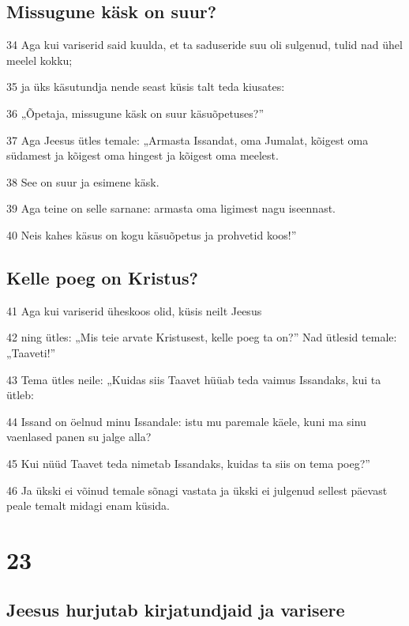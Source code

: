 \section*{Missugune käsk on suur?}

\par 34 Aga kui variserid said kuulda, et ta saduseride suu oli sulgenud, tulid nad ühel meelel kokku;
\par 35 ja üks käsutundja nende seast küsis talt teda kiusates:
\par 36 „Õpetaja, missugune käsk on suur käsuõpetuses?”
\par 37 Aga Jeesus ütles temale: „Armasta Issandat, oma Jumalat, kõigest oma südamest ja kõigest oma hingest ja kõigest oma meelest.
\par 38 See on suur ja esimene käsk.
\par 39 Aga teine on selle sarnane: armasta oma ligimest nagu iseennast.
\par 40 Neis kahes käsus on kogu käsuõpetus ja prohvetid koos!”

\section*{Kelle poeg on Kristus?}

\par 41 Aga kui variserid üheskoos olid, küsis neilt Jeesus
\par 42 ning ütles: „Mis teie arvate Kristusest, kelle poeg ta on?” Nad ütlesid temale: „Taaveti!”
\par 43 Tema ütles neile: „Kuidas siis Taavet hüüab teda vaimus Issandaks, kui ta ütleb:
\par 44 Issand on öelnud minu Issandale: istu mu paremale käele, kuni ma sinu vaenlased panen su jalge alla?
\par 45 Kui nüüd Taavet teda nimetab Issandaks, kuidas ta siis on tema poeg?”
\par 46 Ja ükski ei võinud temale sõnagi vastata ja ükski ei julgenud sellest päevast peale temalt midagi enam küsida.


\chapter{23}

\section*{Jeesus hurjutab kirjatundjaid ja varisere}

